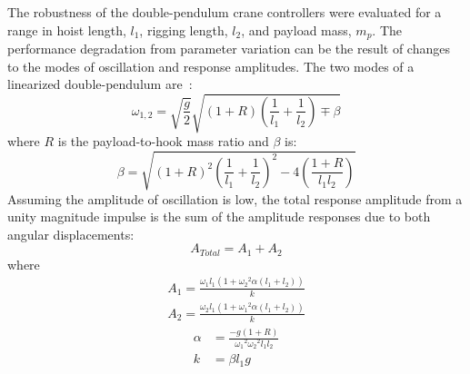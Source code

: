 The robustness of the double-pendulum crane controllers were evaluated for a range in hoist length, $l_1$, rigging length, $l_2$, and payload mass, $m_p$. The performance degradation from parameter variation can be the result of changes to the modes of oscillation and response amplitudes.
%
The two modes of a linearized double-pendulum are~\cite{Blevins:1979a}:
%
\begin{equation}
\omega_{1,2}=\sqrt{\frac{g}{2}}\sqrt{(1+R)\left(\frac{1}{l_1}+\frac{1}{l_2}\right)\mp\beta}
\label{eq_chap4:modes}
\end{equation}
%
where $R$ is the payload-to-hook mass ratio and $\beta$ is:
%
\begin{equation}
\beta = \sqrt{(1+R)^2\left(\frac{1}{l_1}+\frac{1}{l_2}\right)^2-4\left( \frac{1+R}{l_1l_2}\right)}
\end{equation}
%
Assuming the amplitude of oscillation is low,
the total response amplitude from a unity magnitude impulse is the sum of the amplitude responses due to both angular displacements:
%
\begin{equation}
A_{Total} = A_1 + A_2
\end{equation}
%
where
%
\begin{align}
A_1 = \frac{\omega_1l_1(1+{\omega_2}^2\alpha(l_1+l_2))}{k}\\
A_2 = \frac{\omega_2l_1(1+{\omega_1}^2\alpha(l_1+l_2))}{k}
\end{align}
\begin{align}
\alpha & = \frac{-g(1+R)}{{\omega_1}^2{\omega_2}^2l_1l_2}\\
k & = \beta l_1g
\end{align}


